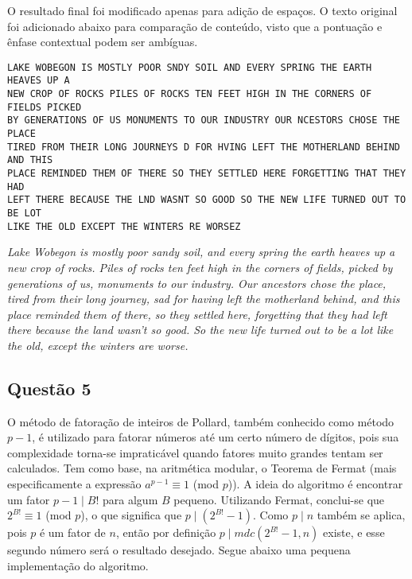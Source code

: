 \documentclass{article}
\begin{document}
O resultado final foi modificado apenas para adição de espaços. O texto
original foi adicionado abaixo para comparação de conteúdo, visto que a
pontuação e ênfase contextual podem ser ambíguas.

\begin{verbatim}
LAKE WOBEGON IS MOSTLY POOR SNDY SOIL AND EVERY SPRING THE EARTH HEAVES UP A
NEW CROP OF ROCKS PILES OF ROCKS TEN FEET HIGH IN THE CORNERS OF FIELDS PICKED
BY GENERATIONS OF US MONUMENTS TO OUR INDUSTRY OUR NCESTORS CHOSE THE PLACE
TIRED FROM THEIR LONG JOURNEYS D FOR HVING LEFT THE MOTHERLAND BEHIND AND THIS
PLACE REMINDED THEM OF THERE SO THEY SETTLED HERE FORGETTING THAT THEY HAD
LEFT THERE BECAUSE THE LND WASNT SO GOOD SO THE NEW LIFE TURNED OUT TO BE LOT
LIKE THE OLD EXCEPT THE WINTERS RE WORSEZ
\end{verbatim}

\textit{Lake Wobegon is mostly poor sandy soil, and every spring the earth
heaves up a new crop of rocks. Piles of rocks ten feet high in the corners of
fields, picked by generations of us, monuments to our industry. Our ancestors
chose the place, tired from their long journey, sad for having left the
motherland behind, and this place reminded them of there, so they settled
here, forgetting that they had left there because the land wasn't so good.
So the new life turned out to be a lot like the old, except the winters are
worse.} \cite{keillor1985lake}

\subsection*{Questão 5}

O método de fatoração de inteiros de Pollard, também conhecido como método
$p -1$, é utilizado para fatorar números até um certo número de dígitos, pois
sua complexidade torna-se impraticável quando fatores muito grandes tentam ser
calculados. Tem como base, na aritmética modular, o Teorema de Fermat (mais
especificamente a expressão $a^{p-1} \equiv 1$ (mod $p$)). A ideia do
algoritmo é encontrar um fator $p - 1 \mid B!$ para algum $B$ pequeno.
Utilizando Fermat, conclui-se que $2^{B!} \equiv 1$ (mod $p$), o que significa
que $p \mid (2^{B!} - 1)$. Como $p \mid n$ também se aplica, pois $p$ é um
fator de $n$, então por definição $p \mid mdc(2^{B!} - 1, n)$ existe, e esse
segundo número será o resultado desejado. Segue abaixo uma pequena
implementação do algoritmo.
\end{document}
